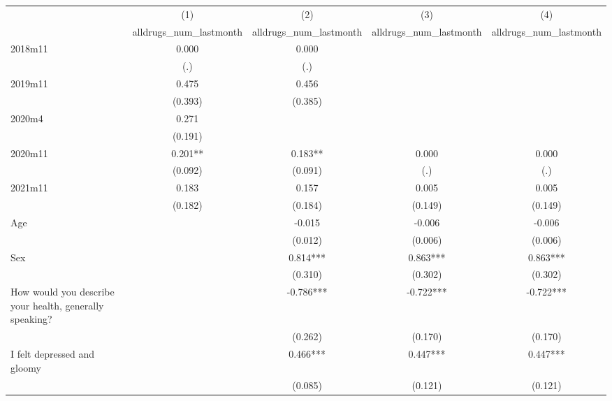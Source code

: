 {
\def\sym#1{\ifmmode^{#1}\else\(^{#1}\)\fi}
\begin{tabular}{l*{4}{c}}
\hline\hline
                &\multicolumn{1}{c}{(1)}&\multicolumn{1}{c}{(2)}&\multicolumn{1}{c}{(3)}&\multicolumn{1}{c}{(4)}\\
                &\multicolumn{1}{c}{alldrugs\_num\_lastmonth}&\multicolumn{1}{c}{alldrugs\_num\_lastmonth}&\multicolumn{1}{c}{alldrugs\_num\_lastmonth}&\multicolumn{1}{c}{alldrugs\_num\_lastmonth}\\
\hline
2018m11         &    0.000   &    0.000   &            &            \\
                &      (.)   &      (.)   &            &            \\
[1em]
2019m11         &    0.475   &    0.456   &            &            \\
                &  (0.393)   &  (0.385)   &            &            \\
[1em]
 2020m4         &    0.271   &            &            &            \\
                &  (0.191)   &            &            &            \\
[1em]
2020m11         &    0.201** &    0.183** &    0.000   &    0.000   \\
                &  (0.092)   &  (0.091)   &      (.)   &      (.)   \\
[1em]
2021m11         &    0.183   &    0.157   &    0.005   &    0.005   \\
                &  (0.182)   &  (0.184)   &  (0.149)   &  (0.149)   \\
[1em]
Age             &            &   -0.015   &   -0.006   &   -0.006   \\
                &            &  (0.012)   &  (0.006)   &  (0.006)   \\
[1em]
Sex             &            &    0.814***&    0.863***&    0.863***\\
                &            &  (0.310)   &  (0.302)   &  (0.302)   \\
[1em]
How would you describe your health, generally speaking?&            &   -0.786***&   -0.722***&   -0.722***\\
                &            &  (0.262)   &  (0.170)   &  (0.170)   \\
[1em]
I felt depressed and gloomy&            &    0.466***&    0.447***&    0.447***\\
                &            &  (0.085)   &  (0.121)   &  (0.121)   \\

\end{tabular}}
